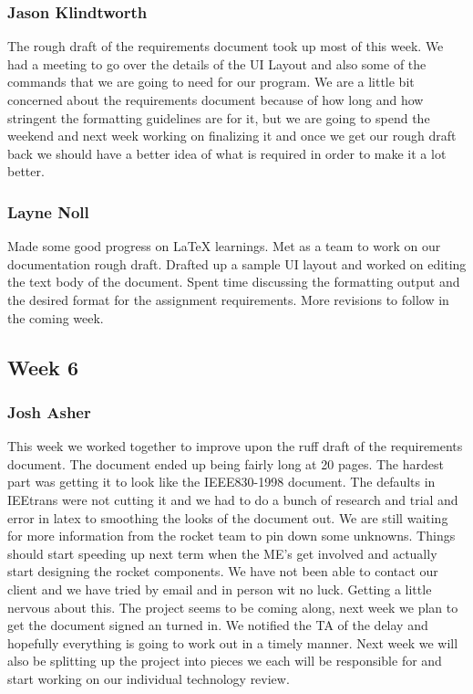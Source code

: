 \documentclass[10pt,draftclsnofoot,onecolumn]{IEEEtran}
\begin{document}
\subsubsection{Jason Klindtworth} The rough draft of the requirements document took up most of this week. We had a meeting to go over the details of the UI Layout and also some of the commands that we are going to need for our program. We are a little bit concerned about the requirements document because of how long and how stringent the formatting guidelines are for it, but we are going to spend the weekend and next week working on finalizing it and once we get our rough draft back we should have a better idea of what is required in order to make it a lot better. \par

\subsubsection{Layne Noll} Made some good progress on LaTeX learnings. Met as a team to work on our documentation rough draft. Drafted up a sample UI layout and worked on editing the text body of the document. Spent time discussing the formatting output and the desired format for the assignment requirements. More revisions to follow in the coming week. \par

\subsection{Week 6}
\subsubsection{Josh Asher} This week we worked together to improve upon the ruff draft of the requirements document. The document ended up being fairly long at 20 pages. The hardest part was getting it to look like the IEEE830-1998 document. The defaults in IEEtrans were not cutting it and we had to do a bunch of research and trial and error in latex to smoothing the looks of the document out. We are still waiting for more information from the rocket team to pin down some unknowns. Things should start speeding up next term when the ME's get involved and actually start designing the rocket components. We have not been able to contact our client and we have tried by email and in person wit no luck. Getting a little nervous about this. The project seems to be coming along, next week we plan to get the document signed an turned in. We notified the TA of the delay and hopefully everything is going to work out in a timely manner. Next week we will also be splitting up the project into pieces we each will be responsible for and start working on our individual technology review.\par
\end{document}
